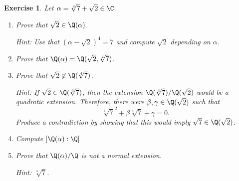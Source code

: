 \documentclass[a4paper,10pt,reqno]{amsart}
\newtheorem{ex}{Exercise}[section]
\begin{document}
\begin{ex}
\label{5.4}
    Let $\alpha=\sqrt[4]{7}+\sqrt{2}\in\C$
    \begin{enumerate}[label=(\roman*)]
        \item Prove that $\sqrt{2}\in \Q(\alpha)$.

        \noindent\textit{Hint:} Use that $(\alpha-\sqrt{2})^4=7$ and compute $\sqrt{2}$ depending on $\alpha$.
        \item Prove that $\Q(\alpha)=\Q(\sqrt{2},\sqrt[4]{7})$.
        \item Prove that $\sqrt{2} \not\in \Q(\sqrt[4]{7})$.

        \noindent\textit{Hint:} If $\sqrt{2} \in \Q(\sqrt[4]{7})$, then the extension $\Q(\sqrt[4]{7})/\Q(\sqrt{2})$ would be a quadratic extension. Therefore, there were $\beta,\gamma \in \Q(\sqrt{2})$ such that
        \[
        \sqrt[4]{7}^2 + \beta \sqrt[4]{7} + \gamma = 0.
        \]
        Produce a contradiction by showing that this would imply $\sqrt{7} \in \Q(\sqrt{2})$.
        \item Compute $[\Q(\alpha):\Q]$
        \item Prove that $\Q(\alpha)/\Q$ is not a normal extension.
        
        \noindent \textit{Hint:} $\sqrt[4]{7}$.
    \end{enumerate}
\end{ex}
\end{document}
